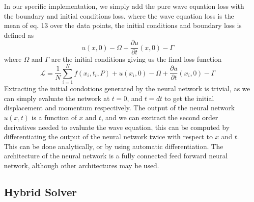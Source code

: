 \documentclass[twoside,11pt]{report}
\begin{document}
    In our specific implementation, we simply add the pure wave equation loss with the boundary and initial conditions loss.
    where the wave equation loss is the mean of eq. 13 over the data points, the initial conditions and boundary loss
    is defined as
    \begin{equation}
        u(x, 0) - \Omega  + \frac{\partial u}{\partial t}(x, 0) - \Gamma
    \end{equation}
    where $\Omega$ and $\Gamma$ are the initial conditions
    giving us the final loss function
    \begin{equation}
        \mathcal{L} = \frac{1}{N}\sum_{i=1}^{N} f(x_i, t_i, P) + u(x_i, 0) - \Omega  + 
        \frac{\partial u}{\partial t}(x_i, 0) - \Gamma
    \end{equation}
    Extracting the initial condotions generated by the neural network is trivial, as we can simply evaluate the network
    at $t=0$, and $t=dt$ to get the initial displacement and momentum respectively. The output of the neural network
    $u(x,t)$ is a function of $x$ and $t$, and we can exctract the second order derivatives
    needed to evaluate the wave equation, this can be computed by differentiating the output of the neural network twice
    with respect to $x$ and $t$. This can be done analytically, or by using automatic differentiation.
    The architecture of the neural network is a fully connected feed forward neural network, although other architectures
    may be used.
    \\
    \cite{fys-stk}
    \cite{krishnapriyan2021characterizing}



\subsection{Hybrid Solver}
\label{sec:hybrid}
     
\end{document}
